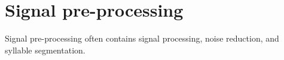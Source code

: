 %
%
%
%

%
%

 


\section{Signal pre-processing}
\label{pre-processing}

Signal pre-processing often contains signal processing, noise reduction, and syllable segmentation. 


